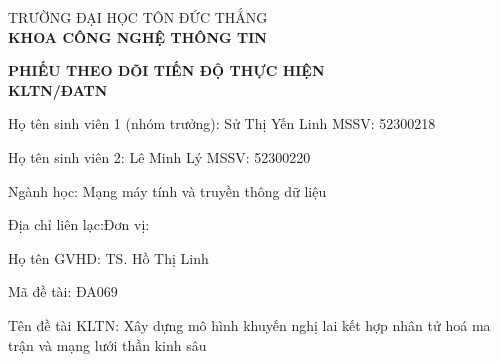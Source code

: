 \documentclass[12pt]{extarticle}
\begin{document}
TRƯỜNG ĐẠI HỌC TÔN ĐỨC THẮNG\\
\hspace*{1.2cm}\textbf{KHOA CÔNG NGHỆ THÔNG TIN}

\vspace{0.8cm}
\begin{center}
{\Large\bfseries PHIẾU THEO DÕI TIẾN ĐỘ THỰC HIỆN\\KLTN/ĐATN}
\end{center}
\vspace{0.4cm}

\begingroup\setlength{\parskip}{6pt}
Họ tên sinh viên 1 (nhóm trưởng): Sử Thị Yến Linh \hfill MSSV: 52300218

Họ tên sinh viên 2: Lê Minh Lý \hspace{1cm} MSSV: 52300220

Ngành học: Mạng máy tính và truyền thông dữ liệu

Địa chỉ liên lạc:\dotfill Đơn vị:\makebox[4cm]{\dotfill}

Họ tên GVHD: TS. Hồ Thị Linh

Mã đề tài: ĐA069

Tên đề tài KLTN: Xây dựng mô hình khuyến nghị lai kết hợp nhân tử hoá ma trận và
mạng lưới thần kinh sâu
\endgroup
\end{document}
